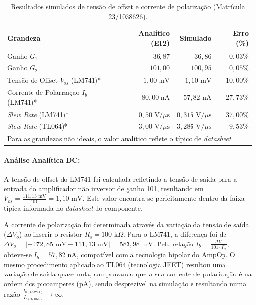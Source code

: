 \documentclass[11pt,a4paper]{article}
\begin{document}
\begin{table}[H]
    \centering
    \caption{Resultados simulados de tensão de offset e corrente de polarização (Matrícula 23/1038626).}
    \label{tab:resultados_cardoso}
    \renewcommand{\arraystretch}{1.2}
    \begin{tabular}{@{}lrrr@{}}
    \toprule
    \textbf{Grandeza} & \textbf{Analítico (E12)} & \textbf{Simulado} & \textbf{Erro (\%)} \\
    \midrule    
    Ganho $G_1$ & $36{,}87$ & $36{,}86$ & $0{,}03\%$ \\
    Ganho $G_2$ & $101{,}00$ & $100{,}95$ & $0{,}05\%$ \\
    Tensão de Offset $V_{os}$ (LM741)* & $1{,}00\text{ mV}$ & $1{,}10\text{ mV}$ & $10{,}00\%$ \\
    Corrente de Polarização $I_b$ (LM741)* & $80{,}00\text{ nA}$ & $57{,}82\text{ nA}$ & $27{,}73\%$ \\
    \textit{Slew Rate} (LM741)* & $0{,}50\text{ V/}\mu\text{s}$ & $0{,}315\text{ V/}\mu\text{s}$ & $37{,}00\%$ \\
    \textit{Slew Rate} (TL064)* & $3{,}00\text{ V/}\mu\text{s}$ & $3{,}286\text{ V/}\mu\text{s}$ & $9{,}53\%$ \\
    \bottomrule
    \multicolumn{4}{l}{\footnotesize * Para as grandezas não ideais, o valor analítico reflete o típico de \textit{datasheet}.}
    \end{tabular}
\end{table}

\paragraph{Análise Analítica DC:}
A tensão de offset do LM741 foi calculada refletindo a tensão de saída para a entrada do amplificador não inversor de ganho 101, resultando em $V_{os}=\frac{111{,}13\text{ mV}}{101}=1{,}10\text{ mV}$. Este valor encontra-se perfeitamente dentro da faixa típica informada no \textit{datasheet} do componente. 

A corrente de polarização foi determinada através da variação da tensão de saída ($\Delta V_o$) ao inserir o resistor $R_s=100\text{ k}\Omega$. Para o LM741, a diferença foi de $\Delta V_o=|-472{,}85\text{ mV}-111{,}13\text{ mV}|=583{,}98\text{ mV}.$ Pela relação $I_b=\frac{\Delta V_o}{101 \cdot R_s}$, obteve-se $I_b=57{,}82\text{ nA}$, compatível com a tecnologia bipolar do AmpOp. O mesmo procedimento aplicado ao TL064 (tecnologia JFET) resultou uma variação de saída quase nula, comprovando que a sua corrente  de polarização é na ordem dos picoamperes (pA), sendo desprezível na simulação e resultando numa razão $\frac{I_{b(LM741)}}{I_{b(TL064)}} \to \infty$.
\end{document}
